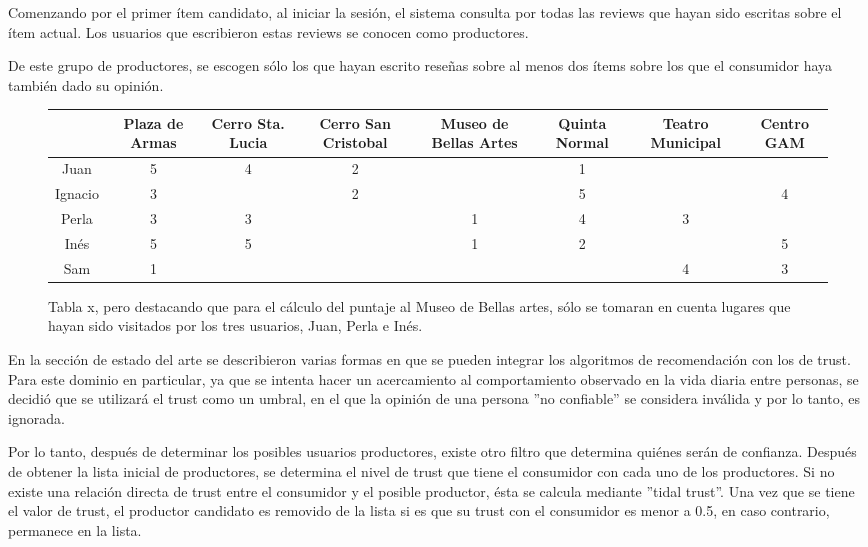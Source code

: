 Comenzando por el primer ítem candidato, al iniciar la sesión, el sistema consulta por todas las reviews que hayan sido escritas sobre el ítem actual. Los usuarios que escribieron estas reviews se conocen como productores.

De este grupo de productores, se escogen sólo los que hayan escrito reseñas sobre al menos dos ítems sobre los que el consumidor haya también dado su opinión.
\begin{figure}
\centering
\begin{adjustbox}{max width=\textwidth}
\begin{tabular}{|c|g|g|c|c|g|c|c|}

                  & Plaza de Armas & Cerro Sta. Lucia & Cerro San Cristobal & Museo de Bellas Artes & Quinta Normal  & Teatro Municipal & Centro GAM \\
\hline
Juan          & 5 & 4 & 2 &   & 1 &   &   \\
\hline
{}Ignacio       & 3 &   & 2 &   & 5 &   & 4 \\
\hline
Perla         & 3 & 3 &   & 1 & 4 & 3 &   \\
\hline
Inés          & 5 & 5 &   & 1 & 2 &   & 5 \\
\hline
Sam          & 1 &  &   &  &  & 4  & 3 \\
\hline

\end{tabular}
\end{adjustbox}
\caption{Tabla x, pero destacando que para el cálculo del puntaje al Museo de Bellas artes, sólo se tomaran en cuenta lugares que hayan sido visitados por los tres usuarios, Juan, Perla e Inés.}

\end{figure}


En la sección de estado del arte se describieron varias formas en que se pueden integrar los algoritmos de recomendación con los de trust. Para este dominio en particular, ya que se intenta hacer un acercamiento al comportamiento observado en la vida diaria entre personas, se decidió que se utilizará el trust como un umbral, en el que la opinión de una persona ''no confiable'' se considera inválida y por lo tanto, es ignorada. 

Por lo tanto, después de determinar los posibles usuarios productores, existe otro filtro que determina quiénes serán de confianza. Después de obtener la lista inicial de productores, se determina el nivel de trust que tiene el consumidor con cada uno de los productores. Si no existe una relación directa de trust entre el consumidor y el posible productor, ésta se calcula mediante ''tidal trust''. Una vez que se tiene el valor de trust, el productor candidato es removido de la lista si es que su trust con el consumidor es menor a 0.5, en caso contrario, permanece en la lista. 

